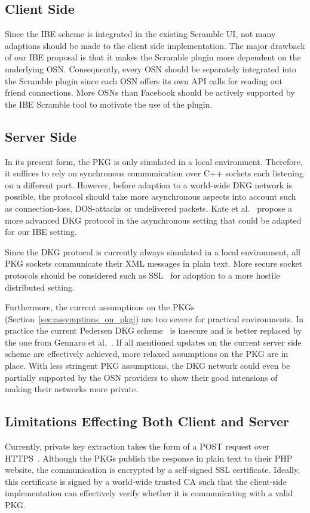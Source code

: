 \subsection{Client Side}
Since the IBE scheme is integrated in the existing Scramble UI, not many adaptions should be made to the client side implementation. The major drawback of our IBE proposal is that it makes the Scramble plugin more dependent on the underlying OSN. Consequently, every OSN should be separately integrated into the Scramble plugin since each OSN offers its own API calls for reading out friend connections. More OSNs than Facebook should be actively supported by the IBE Scramble tool to motivate the use of the plugin.

\subsection{Server Side}
In its present form, the PKG is only simulated in a local environment. Therefore, it suffices to rely on synchronous communication over C++ sockets each listening on a different port. However, before adaption to a world-wide DKG network is possible, the protocol should take more asynchronous aspects into account such as connection-loss, DOS-attacks or undelivered packets. Kate et al.~\cite{art:KateHG12} propose a more advanced DKG protocol in the asynchronous setting that could be adapted for our IBE setting.

Since the DKG protocol is currently always simulated in a local environment, all PKG sockets communicate their XML messages in plain text. More secure socket protocols should be considered such as SSL~\cite{rfc6101} for adoption to a more hostile distributed setting.

Furthermore, the current assumptions on the PKGs (Section~\ref{sec:assymptions_on_pkg}) are too severe for practical environments. In practice the current Pedersen DKG scheme~\cite{art:Pedersen91a} is insecure and is better replaced by the one from Gennaro et al.~\cite{art:GennaroJKR07}. If all mentioned updates on the current server side scheme are effectively achieved, more relaxed assumptions on the PKG are in place. With less stringent PKG assumptions, the DKG network could even be partially supported by the OSN providers to show their good intensions of making their networks more private.

\subsection{Limitations Effecting Both Client and Server}
Currently, private key extraction takes the form of a POST request over HTTPS~\cite{rfc2818}. Although the PKGs publish the response in plain text to their PHP website, the communication is encrypted by a self-signed SSL certificate. Ideally, this certificate is signed by a world-wide trusted CA such that the client-side implementation can effectively verify whether it is communicating with a valid PKG.

